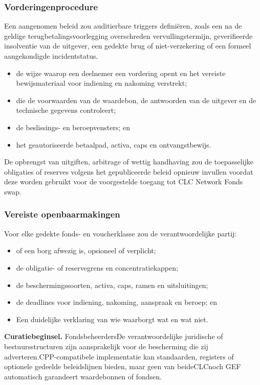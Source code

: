 \documentclass[11pt]{article}
\begin{document}
\subsubsection*{Vorderingenprocedure}

Een aangenomen beleid zou auditierbare triggers definiëren, zoals een na de geldige terugbetalingsvoorlegging overschreden vervullingstermijn, geverifieerde insolventie van de uitgever, een gedekte brug of niet-verzekering of een formeel aangekondigde incidentstatus.

\begin{itemize}[leftmargin=*]
\item de wijze waarop een deelnemer een vordering opent en het vereiste bewijsmateriaal voor indiening en nakoming verstrekt;
\item die de voorwaarden van de waardebon, de antwoorden van de uitgever en de technische gegevens controleert;
\item de beslissings- en beroepvensters; en
\item het geautoriseerde betaalpad, activa, caps en ontvangstbewijs.
\end{itemize}
De opbrengst van uitgiften, arbitrage of wettig handhaving zou de toepasselijke obligaties of reserves volgens het gepubliceerde beleid opnieuw invullen voordat deze worden gebruikt voor de voorgestelde toegang tot CLC Network Fonds swap.

\subsubsection*{Vereiste openbaarmakingen}

Voor elke gedekte fonds- en voucherklasse zou de verantwoordelijke partij:

\begin{itemize}[leftmargin=*]
\item of een borg afwezig is, opsioneel of verplicht;
\item de obligatie- of reservegrens en concentratiekappen;
\item de beschermingssoorten, activa, caps, ramen en uitsluitingen;
\item de deadlines voor indiening, nakoming, aanspraak en beroep; en
\item Een duidelijke verklaring van wie waarborgt wat en wat niet.
\end{itemize}
\textbf{Curatiebeginsel.} FondsbeheerdersDe verantwoordelijke juridische of bestuursstructuren zijn aansprakelijk voor de bescherming die zij adverteren.CPP-compatibele implementatie kan standaarden, registers of optionele gedeelde beleidslijnen bieden, maar geen van beideCLCnoch GEF automatisch garandeert waardebonnen of fondsen.
\end{document}
